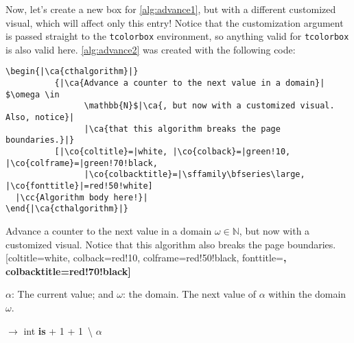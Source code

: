 \documentclass{article}
\begin{document}
Now, let's create a new box for \autoref{alg:advance1}, but with a different customized visual, which will affect only this entry!  Notice that the customization argument is passed straight to the \texttt{tcolorbox} environment, so anything valid for \texttt{tcolorbox} is also valid here.  \autoref{alg:advance2} was created with the following code:

\begin{verbatim}
\begin{|\ca{cthalgorithm}|}
          {|\ca{Advance a counter to the next value in a domain}| $\omega \in
                \mathbb{N}$|\ca{, but now with a customized visual. Also, notice}|
                |\ca{that this algorithm breaks the page boundaries.}|}
          [|\co{coltitle}=|white, |\co{colback}=|green!10, |\co{colframe}=|green!70!black,
                |\co{colbacktitle}=|\sffamily\bfseries\large, |\co{fonttitle}|=red!50!white]
  |\cc{Algorithm body here!}|
\end{|\ca{cthalgorithm}|}
\end{verbatim}

\begin{cthalgorithm}{Advance a counter to the next value in a domain $\omega \in \mathbb{N}$, but now with a customized visual. Notice that this algorithm also breaks the page boundaries.}[coltitle=white, colback=red!10, colframe=red!50!black, fonttitle=\sffamily\bfseries\large, colbacktitle=red!70!black]
  \label{alg:advance2}
\begin{algorithmic}[1]
  \Statex \Input $\alpha$: The current value; and $\omega$: the domain.
  \Statex \Output The next value of $\alpha$ within the domain $\omega$.

  \Vspace

   $\rightarrow$ int \textbf{is}
    \Let {\alpha} {\alpha + 1}
    \While{$\alpha \not\in \omega \And \omega \neq \bracesemptyset$}
      \Let {\alpha} {\alpha + 1}
    \EndWhile
    \If{$\omega \neq \bracesemptyset$}
      \Let {\omega} {\omega \,\backslash \lbrace \alpha \rbrace}
    \EndIf
    \State \Return $\alpha$
  \EndFunction
\end{algorithmic}
\end{cthalgorithm}
\end{document}
